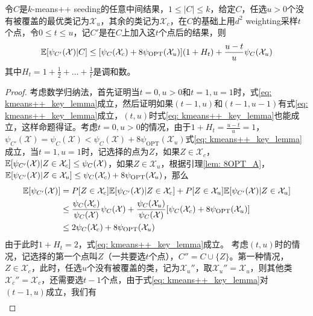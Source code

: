 \begin{lemma}
    \label{lem: kmeans++_key_lemma}
    令$C$是$k$-means++ seeding的任意中间结果，$1 \leq |C| \leq k$，给定$C$，任选$u>0$个没有被覆盖的最优类记为$\mathcal{X}_u$，其余的类记为$\mathcal{X}_c$，在$C$的基础上用$d^2$ weighting采样$t$个点，令$0 \leq t \leq u$，记$C'$是在$C$上加入这$t$个点后的结果，则
    \begin{equation}
        \label{eq: kmeans++_key_lemma}
        \mathbb{E}[\psi_{C'}(\mathcal{X})|C] \leq [\psi_C(\mathcal{X}_c)+8\psi_{\text{OPT}}(\mathcal{X}_u)](1+H_t)+\frac{u-t}{u}\psi_C(\mathcal{X}_u)
    \end{equation}
    其中$H_t = 1+\frac{1}{2}+...+\frac{1}{t}$是调和数。
\end{lemma}
\begin{proof}
    考虑数学归纳法，首先证明当$t=0,u>0$和$t=1,u=1$时，式\ref{eq: kmeans++_key_lemma}成立，然后证明如果$(t-1,u)$和$(t-1,u-1)$有式\ref{eq: kmeans++_key_lemma}成立，$(t,u)$时式\ref{eq: kmeans++_key_lemma}也能成立，这样命题得证。考虑$t=0,u>0$的情况，由于$1+H_t = \frac{u-t}{u} = 1$，$\psi_{C'}(\mathcal{X}) = \psi_C(\mathcal{X}) < \psi_C(\mathcal{X}) + 8\psi_{\text{OPT}}(\mathcal{X}_u)$式\ref{eq: kmeans++_key_lemma}成立，当$t=1,u=1$时，记选择的点为$Z$，如果$Z \in \mathcal{X}_c$，$\mathbb{E}[\psi_{C'}(\mathcal{X})|Z\in \mathcal{X}_c] \leq  \psi_C(\mathcal{X})$，如果$Z \in \mathcal{X}_u$，根据引理\ref{lem: 8OPT_A}，$\mathbb{E}[\psi_{C'}(\mathcal{X})|Z\in \mathcal{X}_u] \leq \psi_C(\mathcal{X}_c) + 8\psi_{\text{OPT}}(\mathcal{X}_u)$，那么
    \begin{align*}
        \mathbb{E}[\psi_{C'}(\mathcal{X})] &= P[Z \in \mathcal{X}_c] \mathbb{E}[\psi_{C'}(\mathcal{X})|Z\in \mathcal{X}_c] + P[Z \in \mathcal{X}_u] \mathbb{E}[\psi_{C'}(\mathcal{X})|Z\in \mathcal{X}_u] \\
        & \leq \frac{\psi_C(\mathcal{X}_c)}{\psi_C(\mathcal{X})} \psi_C(\mathcal{X}) + \frac{\psi_C(\mathcal{X}_u)}{\psi_C(\mathcal{X})} [\psi_C(\mathcal{X}_c)+8\psi_{\text{OPT}}(\mathcal{X}_u)] \\
        & \leq 2\psi_C(\mathcal{X}_c)+8\psi_{\text{OPT}}(\mathcal{X}_u)
    \end{align*}
    由于此时$1+H_t = 2$，式\ref{eq: kmeans++_key_lemma}成立。
    考虑$(t,u)$时的情况，记选择的第一个点叫$Z$（一共要选$t$个点），$C'' = C\cup\{Z\}$。第一种情况，$Z \in \mathcal{X}_c$，此时，任选$u$个没有被覆盖的类，记为$\mathcal{X}_u''$，取$\mathcal{X}_u'' = \mathcal{X}_u$，则其他类$\mathcal{X}_c'' = \mathcal{X}_c$，还需要选$t-1$个点，由于式\ref{eq: kmeans++_key_lemma}对$(t-1,u)$成立，我们有
    \begin{align*}

\end{align*}
\end{proof}
